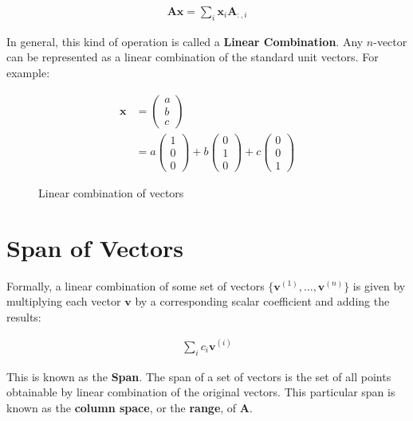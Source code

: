 \begin{align}
\mathbf{A}\mathbf{x} = \sum_{i} \mathbf{x}_{i} \mathbf{A}_{:,i}
\end{align}

\para

In general, this kind of operation is called a \textbf{Linear Combination}. Any \(n\)-vector can be represented as a linear combination of the standard unit vectors. For example:

\begin{align}
\mathbf{x} &= \begin{pmatrix} a \\ b \\ c \end{pmatrix} \\
&= a \begin{pmatrix} 1 \\ 0 \\ 0 \end{pmatrix} + b \begin{pmatrix} 0 \\ 1 \\ 0 \end{pmatrix} + c \begin{pmatrix} 0 \\ 0 \\ 1 \end{pmatrix}
\end{align}

\begin{figure}[ht]
    \centering
    
    \caption{Linear combination of vectors}
    \label{Vector span1}
\end{figure}

\clearpage
\newpage

\section{Span of Vectors}

Formally, a linear combination of some set of vectors \(\{\mathbf{v}^{(1)}, \ldots, \mathbf{v}^{(n)}\}\) is given by multiplying each vector \(\mathbf{v}\) by a corresponding scalar coefficient and adding the results:

\begin{align}
\sum_{i} c_{i} \mathbf{v}^{(i)}
\end{align}

This is known as the \textbf{Span}. The span of a set of vectors is the set of all points obtainable by linear combination of the original vectors. This particular span is known as the \textbf{column space}, or the \textbf{range}, of \(\mathbf{A}\).

